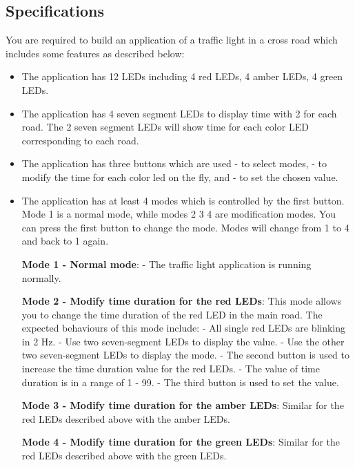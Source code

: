 \subsection{Specifications}
You are required to build an application of a traffic light in a cross road which includes some features as described below:
\begin{itemize}
    \item The application has 12 LEDs including 4 red LEDs, 4 amber LEDs, 4 green LEDs.
    \item The application has 4 seven segment LEDs to display time with 2 for each road. The 2 seven segment LEDs will show time for each color LED corresponding to each road.
    \item The application has three buttons which are used
    \subitem - to select modes, 
    \subitem - to modify the time for each color led on the fly, and 
    \subitem - to set the chosen value. 
    \item The application has at least 4 modes which is controlled by the first button. Mode 1 is a normal mode, while modes 2 3 4 are  modification modes. You can press the first button to change the mode. Modes will change from 1 to 4 and back to 1 again. 
    
    \textbf{Mode 1 - Normal mode}: 
    \subitem - The traffic light application is running normally.   
    
    \textbf{Mode 2 - Modify time duration for the red LEDs}: This mode allows you to change the time duration of the red LED in the main road. The expected behaviours of this mode include:  
    \subitem - All single red LEDs are blinking in 2 Hz. 
    \subitem - Use two seven-segment LEDs to display the value.
    \subitem - Use the other two seven-segment LEDs to display the mode.
    \subitem - The second button is used to increase the time duration value for the red LEDs. 
    \subitem - The value of time duration is in a range of 1 - 99. 
    \subitem - The third button is used to set the value.
    
    
    \textbf{Mode 3 - Modify time duration for the amber LEDs}: Similar for the red LEDs described above with the amber LEDs.
    
    
    \textbf{Mode 4 - Modify time duration for the green LEDs}: Similar for the red LEDs described above with the green LEDs.
\end{itemize}










